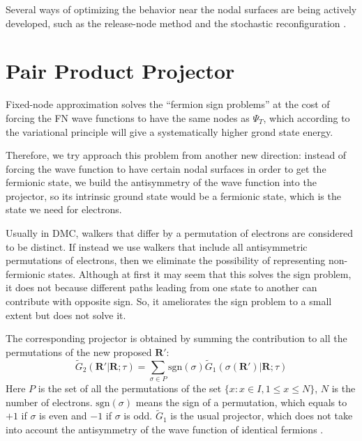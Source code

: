 \documentclass[aps,prl,reprint,groupedaddress]{revtex4-1}
\begin{document}
Several ways of optimizing the behavior near the nodal surfaces are being actively developed, such as the release-node method \cite{ceperley1984quantum} and the stochastic reconfiguration \cite{sorella1998green}.

\section{Pair Product Projector}

Fixed-node approximation solves the ``fermion sign problems'' at the cost of forcing the FN wave functions to have the same nodes as $\Psi_T$, which according to the variational principle will give a systematically higher grond state energy.

Therefore, we try approach this problem from another new direction: instead of forcing the wave function to have certain nodal surfaces in order to get the fermionic state, we build the antisymmetry of the wave function into the projector, so its intrinsic ground state would be a fermionic state, which is the state we need for electrons.

Usually in DMC, walkers that differ by a permutation of electrons are considered to be distinct.  If instead
we use walkers that include all antisymmetric permutations of electrons, then we eliminate the possibility of
representing non-fermionic states.  Although at first it may seem that this solves the sign problem, it does
not because different paths leading from one state to another can contribute with opposite sign.
So, it ameliorates the sign problem to a small extent but does not solve it.

The corresponding projector is obtained by summing the contribution to all the permutations of the new proposed $\bm{R'}$:
\begin{equation}
\label{eq:ppp}
\widetilde{G}_2(\bm{R'}|\bm{R};\tau)
= \sum\limits_{\sigma\in P} \mathrm{sgn}(\sigma) \widetilde{G}_1(\sigma(\bm{R'})|\bm{R};\tau)
\end{equation}
Here $P$ is the set of all the permutations of the set $\{x:x \in I, 1 \leq x \leq N\}$, $N$ is the number of electrons.
$\mathrm{sgn}(\sigma)$ means the sign of a permutation, which equals to $+1$ if $\sigma$ is even and $-1$ if $\sigma$ is odd.
$\widetilde{G}_1$ is the usual projector, which does not take into account the antisymmetry of the wave function of identical fermions \cite{umrigar2015observations}.
\end{document}
